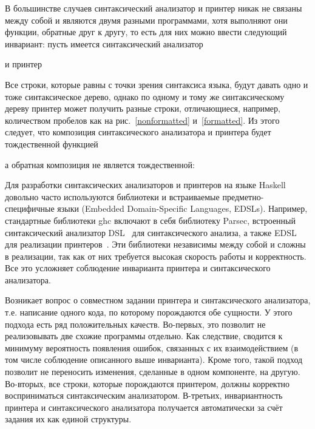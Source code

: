 В большинстве случаев синтаксический анализатор и принтер никак не связаны между собой и являются двумя 
разными программами, хотя выполняют они функции, обратные друг к другу, то есть для них можно 
ввести следующий инвариант: пусть имеется синтаксический анализатор 



\noindent и принтер



Все строки, которые равны с точки зрения синтаксиса языка, будут давать одно и тоже синтаксическое дерево, 
однако по одному и тому же синтаксическому дереву принтер может получить разные строки, отличающиеся, 
например, количеством пробелов как на рис.~\ref{nonformatted} и~\ref{formatted}.
Из этого следует, что композиция синтаксического анализатора и принтера будет тождественной функцией



\noindent а обратная композиция не является тождественной:



Для разработки синтаксических анализаторов и принтеров на языке Haskell довольно часто используются 
библиотеки и встраиваемые предметно-специфичные языки (Embedded Domain-Specific Languages, EDSLs). Например, 
стандартные библиотеки ghc включают в себя библиотеку Parsec, встроенный синтаксический анализатор DSL~\cite{parsec} 
для синтаксического анализа, а также EDSL для реализации принтеров~\cite{Hughes1995}. Эти библиотеки независимы 
между собой и сложны в реализации, так как от них требуется высокая скорость работы и корректность. 
Все это усложняет соблюдение инварианта принтера и синтаксического анализатора.

Возникает вопрос о совместном задании принтера и синтаксического анализатора, т.е. написание одного
кода, по которому порождаются обе сущности. У этого подхода есть ряд 
положительных качеств. Во-первых, это позволит не реализовывать две схожие программы отдельно. 
Как следствие, сводится к минимуму вероятность появления ошибок,
связанных с их взаимодействием (в том числе соблюдение описанного выше инварианта).
Кроме того, 
такой подход позволит не переносить изменения, сделанные в одном компоненте, на другую. Во-вторых, 
все строки, которые порождаются принтером, должны корректно восприниматься синтаксическим анализатором. 
В-третьих, инвариантность принтера и синтаксического анализатора получается автоматически
за счёт задания их как единой структуры.

